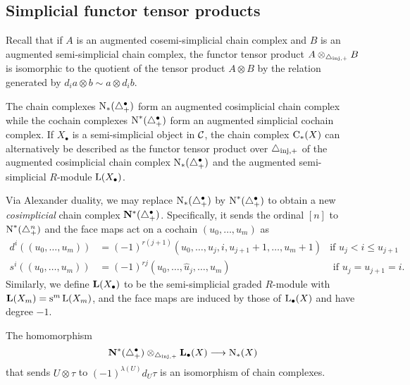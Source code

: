 
\subsection{Simplicial functor tensor products}
Recall that if $A$ is an augmented cosemi-simplicial chain complex and $B$ is an augmented semi-simplicial chain complex, the functor tensor product $A\otimes_{\asimplexinj} B$ is isomorphic to the quotient of the tensor product $A\otimes B$ by the relation generated by $d_i a\otimes b \sim a\otimes d_i b$.


The chain complexes $\chains_*(\asimplex^\bullet)$ form an augmented cosimplicial chain complex while the cochain complexes $\chains^*(\asimplex^\bullet)$ form an augmented simplicial cochain complex. If $X_\bullet$ is a semi-simplicial object in $\cC$, the chain complex $\uchains_*(X)$ can alternatively be described as the functor tensor product over $\asimplexinj$ of the augmented cosimplicial chain complex $\chains_*(\asimplex^{\bullet})$ and the augmented semi-simplicial $R$-module $\rA(X_\bullet)$. 

Via Alexander duality, we may replace $\chains_*(\asimplex^\bullet )$ by $\chains^*(\asimplex^\bullet)$ to obtain a new \emph{cosimplicial} chain complex $\NN^*(\asimplex^\bullet)$. Specifically, it sends the ordinal $[n]$ to $\chains^*(\asimplex^n)$ and the face maps act on a cochain $(u_0,\ldots,u_m)$ as
\begin{align*}
    d^i((u_0,\ldots,u_m)) &= 
        (-1)^{r(j+1)}(u_0,\ldots,u_{j},i,u_{j+1}+1,\ldots,u_{m}+1) 
        & \text{if $u_j<i \leq u_{j+1}$}
    \\
    s^i((u_0,\ldots,u_m)) &= (-1)^{rj}(u_0,\ldots,\hat{u}_j,\ldots,u_m) 
    & \text{ if $u_j = u_{j+1} = i$.}
\end{align*}
Similarly, we define $\AA(X_\bullet)$ to be the semi-simplicial graded $R$-module with $\AA(X_m) = \sus{m}\rA(X_m)$, and the face maps are induced by those of $\rA_\bullet(X)$ and have degree $-1$.

\begin{lemma}\label{lemma:1} The homomorphism
\[
\NN^*(\asimplex^\bullet)\otimes_{\asimplexinj} \AA_\bullet(X)\lra \chains_*(X)
\]
that sends $U\otimes \tau$ to $(-1)^{\lambda(U)}d_U\tau$ is an isomorphism of chain complexes.
\end{lemma}


